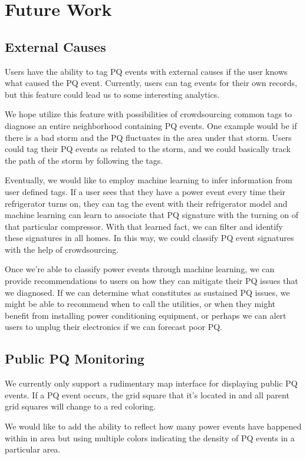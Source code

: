 \documentclass[11pt]{article}
\begin{document}
\section{Future Work}
\subsection{External Causes}
Users have the ability to tag PQ events with external causes if the user knows what caused the PQ event. Currently, users can tag events for their own records, but this feature could lead us to some interesting analytics.

We hope utilize this feature with possibilities of crowdsourcing common tags to diagnose an entire neighborhood containing PQ events. One example would be if there is a bad storm and the PQ fluctuates in the area under that storm. Users could tag their PQ events as related to the storm, and we could basically track the path of the storm by following the tags. 

Eventually, we would like to employ machine learning to infer information from user defined tags. If a user sees that they have a power event every time their refrigerator turns on, they can tag the event with their refrigerator model and machine learning can learn to associate that PQ signature with the turning on of that particular compressor. With that learned fact, we can filter and identify these signatures in all homes. In this way, we could classify PQ event signatures with the help of crowdsourcing.

Once we're able to classify power events through machine learning, we can provide recommendations to users on how they can mitigate their PQ issues that we diagnosed. If we can determine what constitutes as sustained PQ issues, we might be able to recommend when to call the utilities, or when they might benefit from installing power conditioning equipment, or perhaps we can alert users to unplug their electronics if we can forecast poor PQ.

\subsection{Public PQ Monitoring}
We currently only support a rudimentary map interface for displaying public PQ events. If a PQ event occurs, the grid square that it's located in and all parent grid squares will change to a red coloring. 

We would like to add the ability to reflect how many power events have happened within in area but using multiple colors indicating the density of PQ events in a particular area. 
\end{document}
